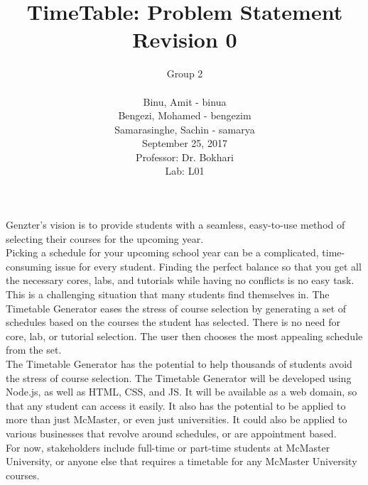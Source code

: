 \documentclass[12pt]{article}
\title{TimeTable: Problem Statement Revision 0}
\author{Group 2 \\
		\\ Binu, Amit - binua
		\\ Bengezi, Mohamed - bengezim
		\\ Samarasinghe, Sachin - samarya
		\\ September 25, 2017
		\\Professor: Dr. Bokhari
		\\ Lab: L01}
\date{}
\begin{document}
\maketitle
Genzter’s vision is to provide students with a seamless, easy-to-use method of selecting their courses for the upcoming year.\\
 
Picking a schedule for your upcoming school year can be a complicated, time-consuming issue for every student. Finding the perfect balance so that you get all the necessary cores, labs, and tutorials while having no conflicts is no easy task. This is a challenging situation that many students find themselves in. The Timetable Generator eases the stress of course selection by generating a set of schedules based on the courses the student has selected. There is no need for core, lab, or tutorial selection. The user then chooses the most appealing schedule from the set. \\

The Timetable Generator has the potential to help thousands of students avoid the stress of course selection. The Timetable Generator will be developed using Node.js, as well as HTML, CSS, and JS. It will be available as a web domain, so that any student can access it easily. It also has the potential to be applied to more than just McMaster, or even just universities. It could also be applied to various businesses that revolve around schedules, or are appointment based.  \\

For now, stakeholders include full-time or part-time students at McMaster University, or anyone else that requires a timetable for any McMaster University courses.


    



\end{document}
